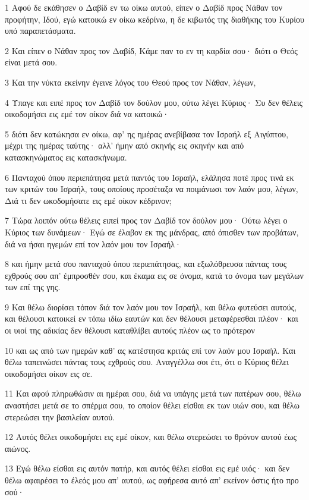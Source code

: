 \par 1 Αφού δε εκάθησεν ο Δαβίδ εν τω οίκω αυτού, είπεν ο Δαβίδ προς Νάθαν τον προφήτην, Ιδού, εγώ κατοικώ εν οίκω κεδρίνω, η δε κιβωτός της διαθήκης του Κυρίου υπό παραπετάσματα.
\par 2 Και είπεν ο Νάθαν προς τον Δαβίδ, Κάμε παν το εν τη καρδία σου· διότι ο Θεός είναι μετά σου.
\par 3 Και την νύκτα εκείνην έγεινε λόγος του Θεού προς τον Νάθαν, λέγων,
\par 4 Ύπαγε και ειπέ προς τον Δαβίδ τον δούλον μου, ούτω λέγει Κύριος· Συ δεν θέλεις οικοδομήσει εις εμέ τον οίκον διά να κατοικώ·
\par 5 διότι δεν κατώκησα εν οίκω, αφ' ης ημέρας ανεβίβασα τον Ισραήλ εξ Αιγύπτου, μέχρι της ημέρας ταύτης· αλλ' ήμην από σκηνής εις σκηνήν και από κατασκηνώματος εις κατασκήνωμα.
\par 6 Πανταχού όπου περιεπάτησα μετά παντός του Ισραήλ, ελάλησα ποτέ προς τινά εκ των κριτών του Ισραήλ, τους οποίους προσέταξα να ποιμάνωσι τον λαόν μου, λέγων, Διά τι δεν ωκοδομήσατε εις εμέ οίκον κέδρινον;
\par 7 Τώρα λοιπόν ούτω θέλεις ειπεί προς τον Δαβίδ τον δούλον μου· Ούτω λέγει ο Κύριος των δυνάμεων· Εγώ σε έλαβον εκ της μάνδρας, από όπισθεν των προβάτων, διά να ήσαι ηγεμών επί τον λαόν μου τον Ισραήλ·
\par 8 και ήμην μετά σου πανταχού όπου περιεπάτησας, και εξωλόθρευσα πάντας τους εχθρούς σου απ' έμπροσθέν σου, και έκαμα εις σε όνομα, κατά το όνομα των μεγάλων των επί της γης.
\par 9 Και θέλω διορίσει τόπον διά τον λαόν μου τον Ισραήλ, και θέλω φυτεύσει αυτούς, και θέλουσι κατοικεί εν τόπω ιδίω εαυτών και δεν θέλουσι μεταφέρεσθαι πλέον· και οι υιοί της αδικίας δεν θέλουσι καταθλίβει αυτούς πλέον ως το πρότερον
\par 10 και ως από των ημερών καθ' ας κατέστησα κριτάς επί τον λαόν μου Ισραήλ. Και θέλω ταπεινώσει πάντας τους εχθρούς σου. Αναγγέλλω σοι έτι, ότι ο Κύριος θέλει οικοδομήσει οίκον εις σε.
\par 11 Και αφού πληρωθώσιν αι ημέραι σου, διά να υπάγης μετά των πατέρων σου, θέλω αναστήσει μετά σε το σπέρμα σου, το οποίον θέλει είσθαι εκ των υιών σου, και θέλω στερεώσει την βασιλείαν αυτού.
\par 12 Αυτός θέλει οικοδομήσει εις εμέ οίκον, και θέλω στερεώσει το θρόνον αυτού έως αιώνος.
\par 13 Εγώ θέλω είσθαι εις αυτόν πατήρ, και αυτός θέλει είσθαι εις εμέ υιός· και δεν θέλω αφαιρέσει το έλεός μου απ' αυτού, ως αφήρεσα αυτό απ' εκείνον όστις ήτο προ σού·
